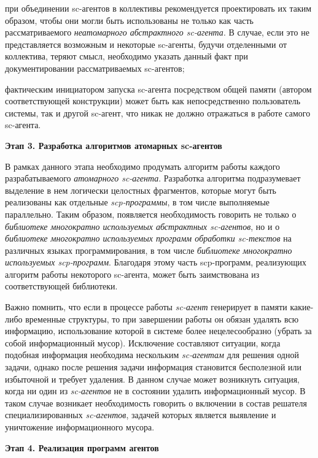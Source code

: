 \begin{textitemize}
\item при объединении sc-агентов в коллективы рекомендуется проектировать их таким образом, чтобы они могли быть использованы не только как часть рассматриваемого \textit{неатомарного абстрактного sc-агента}. В случае, если это не представляется возможным и некоторые sc-агенты, будучи отделенными от коллектива, теряют смысл, необходимо указать данный факт при документировании рассматриваемых sc-агентов;
\item фактическим инициатором запуска sc-агента посредством общей памяти (автором соответствующей конструкции) может быть как непосредственно пользователь системы, так и другой sc-агент, что никак не должно отражаться в работе самого sc-агента.
\end{textitemize}

\textbf{Этап 3. Разработка алгоритмов атомарных sc-агентов}

В рамках данного этапа необходимо продумать алгоритм работы каждого разрабатываемого \textit{атомарного sc-агента}. Разработка алгоритма подразумевает выделение в нем логически целостных фрагментов, которые могут быть реализованы как отдельные \textit{scp-программы}, в том числе выполняемые параллельно. Таким образом, появляется необходимость говорить не только о \textit{библиотеке многократно используемых абстрактных sc-агентов}, но и о \textit{библиотеке многократно используемых программ обработки sc-текстов} на различных языках программирования, в том числе \textit{библиотеке многократно используемых scp-программ}. Благодаря этому часть scp-программ, реализующих алгоритм работы некоторого sc-агента, может быть заимствована из соответствующей библиотеки.

Важно помнить, что если в процессе работы \textit{sc-агент} генерирует в памяти какие-либо временные структуры, то при завершении работы он обязан удалять всю информацию, использование которой в системе более нецелесообразно (убрать за собой информационный мусор). Исключение составляют ситуации, когда подобная информация необходима нескольким \textit{sc-агентам} для решения одной задачи, однако после решения задачи информация становится бесполезной или избыточной и требует удаления. В данном случае может возникнуть ситуация, когда ни один из \textit{sc-агентов} не в состоянии удалить информационный мусор. В таком случае возникает необходимость говорить о включении в состав решателя специализированных \textit{sc-агентов}, задачей которых является выявление и уничтожение информационного мусора.

\textbf{Этап 4. Реализация программ агентов}

